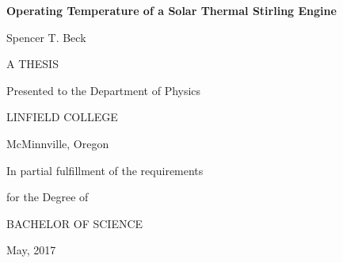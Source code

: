 %
  \begin{center}

    \vspace*{1.5in}

    \singlespacing

    \textbf{Operating Temperature of a Solar Thermal Stirling Engine}

    \doublespacing
    \vspace{1.0in}
    
    {Spencer T. Beck}

    \vspace{2.5in}

    {A THESIS}

    \singlespacing

    Presented to the Department of Physics

    LINFIELD COLLEGE
    
    McMinnville, Oregon
    
    \vspace{0.5in}

    In partial fulfillment of the requirements

    for the Degree of

    \doublespacing

    {BACHELOR OF SCIENCE}

   {May, 2017}

  \end{center}